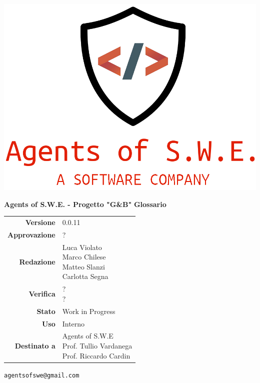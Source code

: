 


\begin{titlepage}
\thispagestyle{empty}

\begin{center}

\includegraphics[scale=0.3]{./images/logo.png} 

\large \textbf{Agents of S.W.E. - Progetto "G\&B"}
\vfill
\Huge \textbf{Glossario}
\vfill
\large
\renewcommand{\arraystretch}{1.3}
\begin{tabular}{r|l}
\textbf{Versione} & 0.0.11\\
\textbf{Approvazione} & ?\\
\textbf{Redazione} & \parbox[t]{5cm}{Luca Violato\\Marco Chilese\\Matteo Slanzi\\Carlotta Segna}\\
\textbf{Verifica} & \parbox[t]{5cm}{?\\?}\\
\textbf{Stato} & Work in Progress\\
\textbf{Uso} & Interno\\
\textbf{Destinato a} & \parbox[t]{5cm}{Agents of S.W.E \\Prof. Tullio Vardanega\\Prof. Riccardo Cardin}
\end{tabular}
\vfill
\small
\texttt{agentsofswe@gmail.com}
\end{center}
\end{titlepage}

